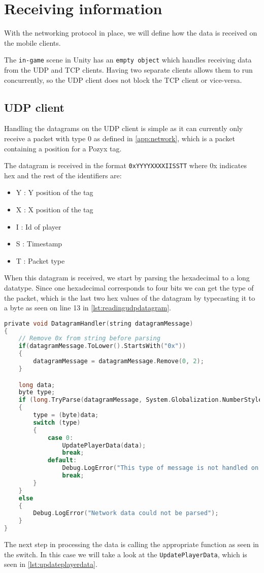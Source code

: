 \section{Receiving information}\label{sec:receiving-the-information}
With the networking protocol in place, we will define how the data is received on the mobile clients.

The \texttt{in-game} scene in Unity has an \texttt{empty object} which handles receiving data from the UDP and TCP clients.
Having two separate clients allows them to run concurrently, so the UDP client does not block the TCP client or vice-versa.

\subsection*{UDP client}
Handling the datagrams on the UDP client is simple as it can currently only receive a packet with type 0 as defined in \autoref{app:network}, which is a packet containing a position for a Pozyx tag.

The datagram is received in the format \texttt{0xYYYYXXXXIISSTT} where 0x indicates hex and the rest of the identifiers are:
\begin{itemize}
    \item Y : Y position of the tag
    \item X : X position of the tag
    \item I : Id of player
    \item S : Timestamp
    \item T : Packet type
\end{itemize}

\noindent
When this datagram is received, we start by parsing the hexadecimal to a long datatype.
Since one hexadecimal corresponds to four bits we can get the type of the packet, which is the last two hex values of the datagram by typecasting it to a byte as seen on line 13 in \autoref{lst:readingudpdatagram}.

\begin{lstlisting}[caption={Processing datagrams in UDP client}, captionpos=b,language=C,label={lst:readingudpdatagram}]
private void DatagramHandler(string datagramMessage)
{
    // Remove 0x from string before parsing
    if(datagramMessage.ToLower().StartsWith("0x"))
    {
        datagramMessage = datagramMessage.Remove(0, 2);
    }

    long data;
    byte type;
    if (long.TryParse(datagramMessage, System.Globalization.NumberStyles.HexNumber, System.Globalization.CultureInfo.InvariantCulture, out data))
    {
        type = (byte)data;
        switch (type)
        {
            case 0:
                UpdatePlayerData(data);
                break;
            default:
                Debug.LogError("This type of message is not handled on UDP");
                break;
        }
    }
    else
    {
        Debug.LogError("Network data could not be parsed");
    }
}
\end{lstlisting}
\noindent
The next step in processing the data is calling the appropriate function as seen in the switch.
In this case we will take a look at the \texttt{UpdatePlayerData}, which is seen in \autoref{lst:updateplayerdata}.


